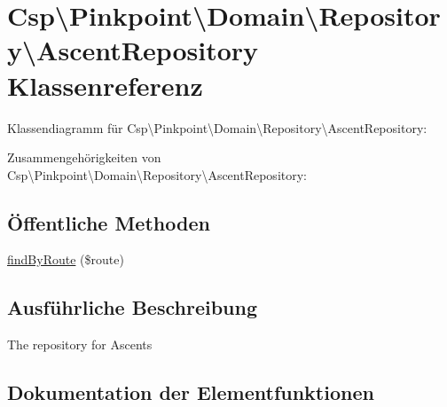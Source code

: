 \hypertarget{classCsp_1_1Pinkpoint_1_1Domain_1_1Repository_1_1AscentRepository}{}\section{Csp\textbackslash{}Pinkpoint\textbackslash{}Domain\textbackslash{}Repository\textbackslash{}Ascent\+Repository Klassenreferenz}
\label{classCsp_1_1Pinkpoint_1_1Domain_1_1Repository_1_1AscentRepository}


Klassendiagramm für Csp\textbackslash{}Pinkpoint\textbackslash{}Domain\textbackslash{}Repository\textbackslash{}Ascent\+Repository\+:


Zusammengehörigkeiten von Csp\textbackslash{}Pinkpoint\textbackslash{}Domain\textbackslash{}Repository\textbackslash{}Ascent\+Repository\+:
\subsection*{Öffentliche Methoden}
\begin{DoxyCompactItemize}
\item 
\hyperlink{classCsp_1_1Pinkpoint_1_1Domain_1_1Repository_1_1AscentRepository_abbf08320de30f66da2343ed4c3d55704}{find\+By\+Route} (\$route)
\end{DoxyCompactItemize}


\subsection{Ausführliche Beschreibung}
The repository for Ascents 

\subsection{Dokumentation der Elementfunktionen}
\mbox{\label{classCsp_1_1Pinkpoint_1_1Domain_1_1Repository_1_1AscentRepository_abbf08320de30f66da2343ed4c3d55704}} 

